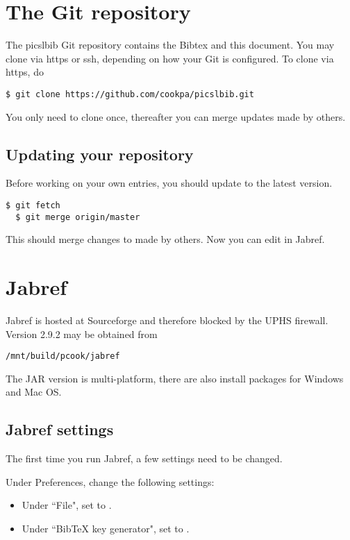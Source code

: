 \documentclass{InsightArticle}
\begin{document}
\section{The Git repository}

The picslbib Git repository contains the Bibtex and this document. You may clone via https or ssh, depending on how your Git is configured. To clone via https, do
\begin{lstlisting}[style=bash]
  $ git clone https://github.com/cookpa/picslbib.git
\end{lstlisting}

You only need to clone once, thereafter you can merge updates made by others. 


\subsection{Updating your repository}

Before working on your own entries, you should update to the latest version.
\begin{lstlisting}[style=bash]
  $ git fetch
  $ git merge origin/master
\end{lstlisting}

This should merge changes to  made by others. Now you can edit  in Jabref.


\section{Jabref}

Jabref is hosted at Sourceforge and therefore blocked by the UPHS firewall. Version 2.9.2 may be obtained from
\begin{lstlisting}[style=bash]
  /mnt/build/pcook/jabref
\end{lstlisting}
The JAR version is multi-platform, there are also install packages for Windows and Mac OS.

\subsection{Jabref settings}

The first time you run Jabref, a few settings need to be changed.

Under Preferences, change the following settings:
\begin{itemize}
\item Under ``File", set  to .
\item Under ``BibTeX key generator", set  to .
\end{itemize}
\end{document}
